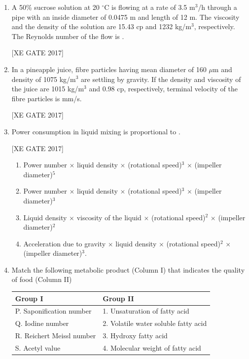 \documentclass[journal,12pt,onecolumn]{IEEEtran}
\theoremstyle{remark}
\begin{document}
\begin{enumerate}
\item A 50\% sucrose solution at 20 $^\circ$C is flowing at a rate of 3.5 m$^3$/h through a pipe with an inside diameter of 0.0475 m and length of 12 m. The viscosity and the density of the solution are 15.43 cp and 1232 kg/m$^3$, respectively. The Reynolds number of the flow is \underline{\hspace{3cm}}.

\hfill [XE GATE 2017]

\item In a pineapple juice, fibre particles having mean diameter of 160 $\mu$m and density of 1075 kg/m$^3$ are settling by gravity. If the density and viscosity of the juice are 1015 kg/m$^3$ and 0.98 cp, respectively, terminal velocity of the fibre particles is \underline{\hspace{3cm}} mm/s.

\hfill [XE GATE 2017]

\item Power consumption in liquid mixing is proportional to \underline{\hspace{3cm}}.

\hfill [XE GATE 2017]

\begin{multicols}{2} %
\begin{enumerate}
    \item Power number $\times$ liquid density $\times$ (rotational speed)$^3$ $\times$ (impeller diameter)$^5$
    \item Power number $\times$ liquid density $\times$ (rotational speed)$^3$ $\times$ (impeller diameter)$^3$
    \item Liquid density $\times$ viscosity of the liquid $\times$ (rotational speed)$^2$ $\times$ (impeller diameter)$^2$
    \item Acceleration due to gravity $\times$ liquid density $\times$ (rotational speed)$^2$ $\times$ (impeller diameter)$^3$.
\end{enumerate}
\end{multicols}

\item Match the following metabolic product (Column I) that indicates the quality of food (Column II)

\begin{tabular}{|p{}|p{}|}
\hline
\textbf{Group I} & \textbf{Group II} \\
\hline
P. Saponification number & 1. Unsaturation of fatty acid \\
Q. Iodine number & 2. Volatile water soluble fatty acid \\
R. Reichert Meissl number & 3. Hydroxy fatty acid \\
S. Acetyl value & 4. Molecular weight of fatty acid \\
\hline
\end{tabular}


\end{enumerate}
\end{document}
